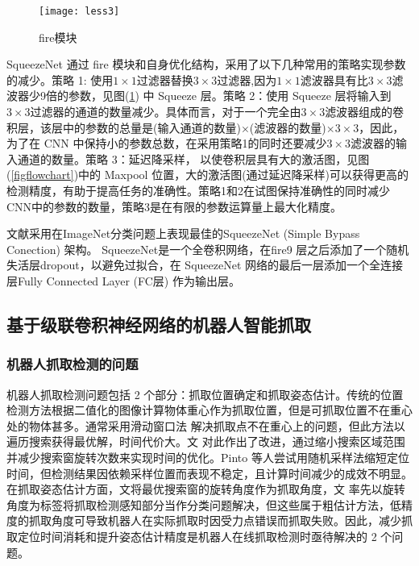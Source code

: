 \documentclass[no-math, withoutpreface]{YangThesis}
\begin{document}
\begin{figure}[!htbp]
	\centering
	\texttt{[image: less3]}
	\caption{f\/ire模块}
     \label{figfire}
\end{figure}

SqueezeNet 通过 f\/ire 模块和自身优化结构，采用了以下几种常用的策略实现参数的减少。策略 1: 使用$1\times1$过滤器替换$3\times3$过滤器,因为$1\times1$滤波器具有比$3\times3$滤波器少9倍的参数，见图(\ref{figfire}) 中 Squeeze 层。策略 2：使用 Squeeze 层将输入到$3\times3$过滤器的通道的数量减少。具体而言，对于一个完全由$3\times3$滤波器组成的卷积层，该层中的参数的总量是(输入通道的数量)$\times$(滤波器的数量)$\times3\times3$，因此，为了在 CNN 中保持小的参数总数，在采用策略1的同时还要减少$3\times3$滤波器的输入通道的数量。策略 3：延迟降采样， 以使卷积层具有大的激活图，见图(\ref{figflowchart})中的 Maxpool 位置，大的激活图(通过延迟降采样)可以获得更高的检测精度，有助于提高任务的准确性\cite{bib16}。策略1和2在试图保持准确性的同时减少CNN中的参数的数量，策略3是在有限的参数运算量上最大化精度。 

文献\cite{bib:one}采用在ImageNet分类问题上表现最佳的SqueezeNet (Simple Bypass  Conection) 架构\cite{bib12}。 SqueezeNet是一个全卷积网络，在f\/ire9 层之后添加了一个随机失活层dropout\cite{bib17}，以避免过拟合，在 SqueezeNet 网络的最后一层添加一个全连接层Fully Connected Layer (FC层) 作为输出层。

\subsection{基于级联卷积神经网络的机器人智能抓取}

\subsubsection{机器人抓取检测的问题}

机器人抓取检测问题包括 2 个部分：抓取位置确定和抓取姿态估计。传统的位置检测方法根据二值化的图像计算物体重心作为抓取位置，但是可抓取位置不在重心处的物体甚多。通常采用滑动窗口法\cite{bibb6,bibb7} 解决抓取点不在重心上的问题，但此方法以遍历搜索获得最优解，时间代价大。文\cite{bibb8} 对此作出了改进，通过缩小搜索区域范围并减少搜索窗旋转次数来实现时间的优化。Pinto 等人\cite{bibb9}尝试用随机采样法缩短定位时间，但检测结果因依赖采样位置而表现不稳定，且计算时间减少的成效不明显。 在抓取姿态估计方面，文\cite{bibb7,bibb10}将最优搜索窗的旋转角度作为抓取角度，文\cite{bibb9} 率先以旋转角度为标签将抓取检测感知部分当作分类问题解决，但这些属于粗估计方法，低精度的抓取角度可导致机器人在实际抓取时因受力点错误而抓取失败。因此，减少抓取定位时间消耗和提升姿态估计精度是机器人在线抓取检测时亟待解决的 2 个问题。
\end{document}
